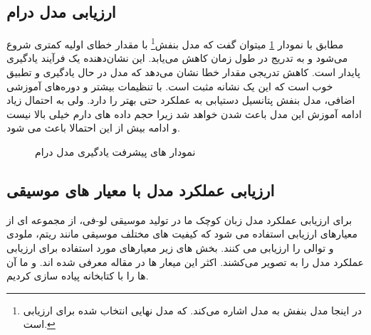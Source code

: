 \subsection{ارزیابی مدل درام}
مطابق با نمودار \ref{Fig:lrdr} میتوان گفت که
مدل بنفش\footnote{در اینجا مدل بنفش به مدل   اشاره می‌کند. که مدل نهایی انتخاب شده برای ارزیابی است.} با مقدار خطای اولیه کمتری شروع می‌شود و به تدریج در طول زمان کاهش می‌یابد. این نشان‌دهنده یک فرآیند یادگیری پایدار است.
کاهش تدریجی مقدار خطا نشان می‌دهد که مدل در حال یادگیری و تطبیق خوب است که این یک نشانه مثبت است. با تنظیمات بیشتر و دوره‌های آموزشی اضافی، مدل بنفش پتانسیل دستیابی به عملکرد حتی بهتر را دارد. ولی به احتمال زیاد ادامه آموزش این مدل باعث  شدن خواهد شد زیرا حجم داده های دارم خیلی بالا نیست و ادامه بیش از این احتمالا باعث  می شود.

\begin{figure}
      \centering
      \qquad
      \caption{نمودار های پیشرفت یادگیری مدل درام}
      \label{Fig:lrdr}
\end{figure}

\subsection{ارزیابی عملکرد مدل با معیار های موسیقی}

برای ارزیابی عملکرد مدل زبان کوچک ما در تولید موسیقی لو-فی، از مجموعه ای از معیارهای ارزیابی استفاده می شود که کیفیت های مختلف موسیقی مانند ریتم، ملودی و توالی را ارزیابی می کنند. بخش های زیر معیارهای مورد استفاده برای ارزیابی عملکرد مدل را به تصویر می‌کشند. اکثر این میعار ها در مقاله  \cite{xiong2023comprehensive} معرفی شده اند. و ما آن ها را با کتابخانه  \cite{conf/ismir/CuthbertA10} پیاده سازی کردیم.
